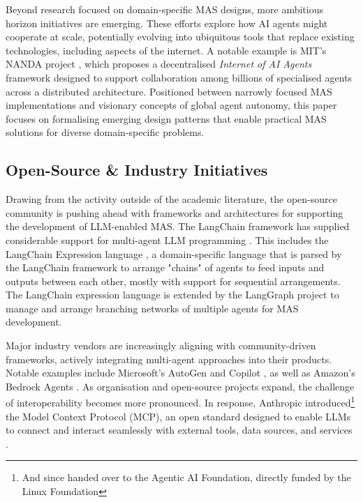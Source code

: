 \documentclass{article}
\begin{document}
Beyond research focused on domain-specific MAS designs, more ambitious horizon initiatives are emerging. These efforts explore how AI agents might cooperate at scale, potentially evolving into ubiquitous tools that replace existing technologies, including aspects of the internet. A notable example is MIT’s NANDA project \cite{MIT2025NANDA, raskar2025beyond}, which proposes a decentralised \emph{Internet of AI Agents} framework designed to support collaboration among billions of specialised agents across a distributed architecture. Positioned between narrowly focused MAS implementations and visionary concepts of global agent autonomy, this paper focuses on formalising emerging design patterns that enable practical MAS solutions for diverse domain-specific problems.

\subsection{Open-Source \& Industry Initiatives}

Drawing from the activity outside of the academic literature, the open-source community is pushing ahead with frameworks and architectures for supporting the development of LLM-enabled MAS. The LangChain framework has supplied considerable support for multi-agent LLM programming \cite{topsakal2023creating}. This includes the LangChain Expression language \cite{Darmon2024LCEL}, a domain-specific language that is parsed by the LangChain framework to arrange "chains" of agents to feed inputs and outputs between each other, mostly with support for sequential arrangements. The LangChain expression language is extended by the LangGraph project  \cite{jeong2024study} to manage and arrange branching networks of multiple agents for MAS development.

Major industry vendors are increasingly aligning with community-driven frameworks, actively integrating multi-agent approaches into their products. Notable examples include Microsoft’s AutoGen \cite{wu2023autogen} and Copilot \cite{khan2024microsoft}, as well as Amazon’s Bedrock Agents \cite{amazon2025bedrockagents}. As organisation and open-source projects expand, the challenge of interoperability becomes more pronounced. In response, Anthropic introduced\footnote{And since handed over to the Agentic AI Foundation, directly funded by the Linux Foundation} the Model Context Protocol (MCP), an open standard designed to enable LLMs to connect and interact seamlessly with external tools, data sources, and services \cite{hou2025model}.
\end{document}
